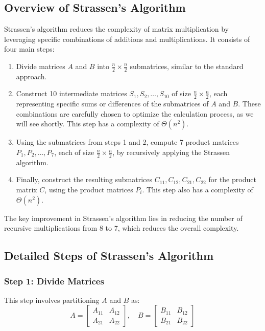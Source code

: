     \subsection{Overview of Strassen's Algorithm}
    Strassen’s algorithm reduces the complexity of matrix multiplication by leveraging specific combinations of additions and multiplications. It consists of four main steps:
    \begin{enumerate}
        \item Divide matrices \(A\) and \(B\) into \( \frac{n}{2} \times \frac{n}{2} \) submatrices, similar to the standard approach.
        \item Construct 10 intermediate matrices \( S_1, S_2, \dots, S_{10} \) of size \( \frac{n}{2} \times \frac{n}{2} \), each representing specific sums or differences of the submatrices of \(A\) and \(B\). These combinations are carefully chosen to optimize the calculation process, as we will see shortly. This step has a complexity of \(\Theta(n^2)\).
        \item Using the submatrices from steps 1 and 2, compute 7 product matrices \( P_1, P_2, \dots, P_7 \), each of size \( \frac{n}{2} \times \frac{n}{2} \), by recursively applying the Strassen algorithm.
        \item Finally, construct the resulting submatrices \( C_{11}, C_{12}, C_{21}, C_{22} \) for the product matrix \(C\), using the product matrices \(P_i\). This step also has a complexity of \(\Theta(n^2)\).
    \end{enumerate}
    
    The key improvement in Strassen's algorithm lies in reducing the number of recursive multiplications from 8 to 7, which reduces the overall complexity.
    
    \subsection{Detailed Steps of Strassen’s Algorithm}
    \subsubsection*{Step 1: Divide Matrices}
    This step involves partitioning \(A\) and \(B\) as:
    \[
    A = \begin{bmatrix} A_{11} & A_{12} \\ A_{21} & A_{22} \end{bmatrix}, \quad B = \begin{bmatrix} B_{11} & B_{12} \\ B_{21} & B_{22} \end{bmatrix}
    \]
    
